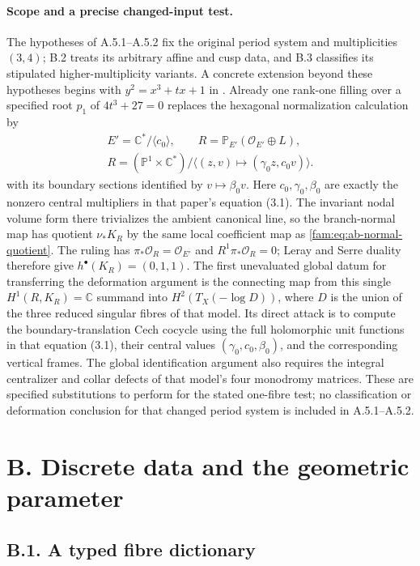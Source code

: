 \paragraph{Scope and a precise changed-input test.}
The hypotheses of A.5.1--A.5.2 fix the original period system and
multiplicities $(3,4)$; B.2 treats its arbitrary affine and cusp data,
and B.3 classifies its stipulated higher-multiplicity variants.
A concrete extension beyond these hypotheses begins with
$y^2=x^3+tx+1$ in \cite[Sections 2--3 and Proposition 6.1]{VTwo26}.
Already one rank-one filling over a specified root $p_1$ of
$4t^3+27=0$ replaces the hexagonal normalization calculation by
\[
 \begin{gathered}
 E'=\mathbb C^*/\langle c_0\rangle,\qquad
 R=\mathbb P_{E'}(\mathcal O_{E'}\oplus L),\\
 R=(\mathbb P^1\times\mathbb C^*)/
       \langle(z,v)\mapsto(\gamma_0z,c_0v)\rangle.
 \end{gathered}
\]
with its boundary sections identified by $v\mapsto\beta_0v$.
Here $c_0,\gamma_0,\beta_0$ are exactly the nonzero central multipliers
in that paper's equation (3.1). The invariant nodal volume form there
trivializes the ambient canonical line, so the branch-normal map has
quotient $\nu_*K_R$ by the same local coefficient map as
\eqref{fam:eq:ab-normal-quotient}. The ruling has
$\pi_*\mathcal O_R=\mathcal O_{E'}$ and $R^1\pi_*\mathcal O_R=0$;
Leray and Serre duality therefore give $h^\bullet(K_R)=(0,1,1)$.
The first unevaluated global datum for transferring the deformation
argument is the connecting map from this single
$H^1(R,K_R)=\mathbb C$ summand into $H^2(T_X(-\log D))$, where
$D$ is the union of the three reduced singular fibres of that model.
Its direct attack is to compute the boundary-translation Cech cocycle
using the full holomorphic unit functions in that equation (3.1),
their central values $(\gamma_0,c_0,\beta_0)$, and the corresponding
vertical frames.
The global identification argument also requires the integral
centralizer and collar defects of that model's four monodromy matrices.
These are specified substitutions to perform for the stated one-fibre
test; no classification or deformation conclusion for that changed
period system is included in A.5.1--A.5.2.

\section{B. Discrete data and the geometric parameter}
\subsection{B.1. A typed fibre dictionary}

